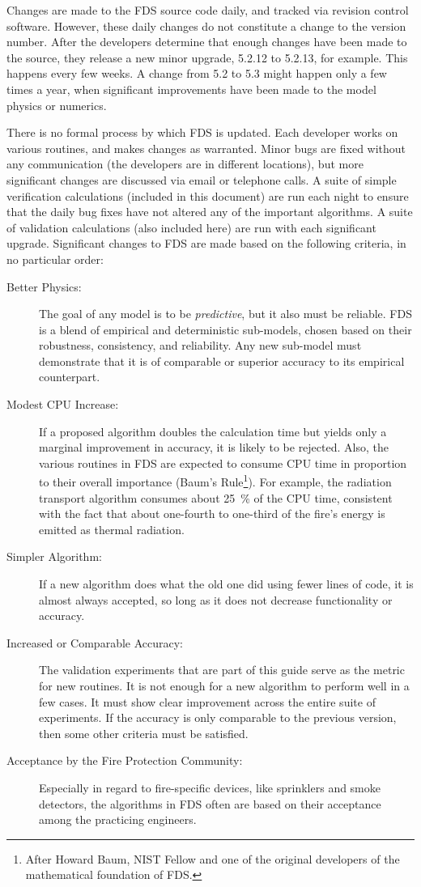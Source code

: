 \documentclass[11pt]{book}
\begin{document}
Changes are made to the FDS source code daily, and tracked via revision control software. However, these daily changes do not constitute a change to the version number. After the developers determine that enough changes have been made to the source, they release a new minor upgrade, 5.2.12 to 5.2.13, for example. This happens every few weeks. A change from 5.2 to 5.3 might happen only a few times a year, when significant improvements have been made to the model physics or numerics.

There is no formal process by which FDS is updated. Each developer works on various routines, and makes changes as warranted. Minor bugs are fixed without any communication (the developers are in different locations), but more significant changes are discussed via email or telephone calls. A suite of simple verification calculations (included in this document) are run each night to ensure that the daily bug fixes have not altered any of the important algorithms. A suite of validation calculations (also included here) are run with each significant upgrade. Significant changes to FDS are made based on the following criteria, in no particular order:
\begin{description}
\item[Better Physics:] The goal of any model is to be {\em predictive}, but it also must be reliable. FDS is a blend of empirical and deterministic sub-models, chosen based on their robustness, consistency, and reliability. Any new sub-model must demonstrate that it is of comparable or superior accuracy to its empirical counterpart.
\item[Modest CPU Increase:] If a proposed algorithm doubles the calculation time but yields only a marginal improvement in accuracy, it is likely to be rejected. Also, the various routines in FDS are expected to consume CPU time in proportion to their overall importance (Baum's Rule\footnote{After Howard Baum, NIST Fellow and one of the original developers of the mathematical foundation of FDS.}). For example, the radiation transport algorithm consumes about 25~\% of the CPU time, consistent with the fact that about one-fourth to one-third of the fire's energy is emitted as thermal radiation.
\item[Simpler Algorithm:] If a new algorithm does what the old one did using fewer lines of code, it is almost always accepted, so long as it does not decrease functionality or accuracy.
\item[Increased or Comparable Accuracy:] The validation experiments that are part of this guide serve as the metric for new routines. It is not enough for a new algorithm to perform well in a few cases. It must show clear improvement across the entire suite of experiments. If the accuracy is only comparable to the previous version, then some other criteria must be satisfied.
\item[Acceptance by the Fire Protection Community:] Especially in regard to fire-specific devices, like sprinklers and smoke detectors, the algorithms in FDS often are based on their acceptance among the practicing engineers.
\end{description}
\end{document}
